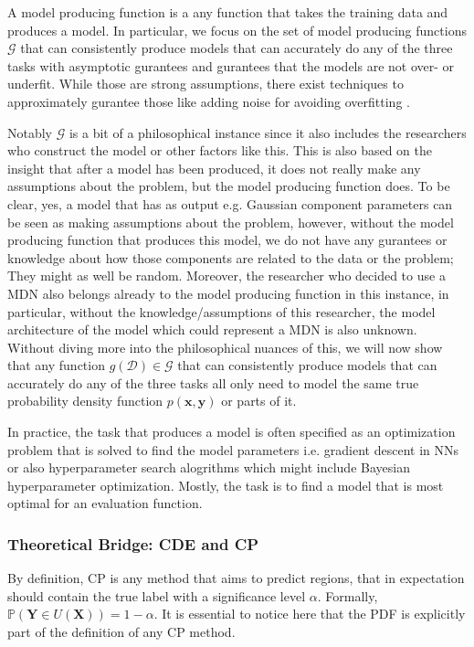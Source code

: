 A model producing function is a any function that takes the training data and produces a model. In particular, we focus on the set of model producing functions $\mathcal{G}$ that can consistently produce models that can accurately do any of the three tasks with asymptotic gurantees and gurantees that the models are not over- or underfit. While those are strong assumptions, there exist techniques to approximately gurantee those like adding noise for avoiding overfitting \cite{rothfuss2019noise}.

Notably $\mathcal{G}$ is a bit of a philosophical instance since it also includes the researchers who construct the model or other factors like this. This is also based on the insight that after a model has been produced, it does not really make any assumptions about the problem, but the model producing function does. To be clear, yes, a model that has as output e.g. Gaussian component parameters can be seen as making assumptions about the problem, however, without the model producing function that produces this model, we do not have any gurantees or knowledge about how those components are related to the data or the problem; They might as well be random. Moreover, the researcher who decided to use a MDN also belongs already to the model producing function in this instance, in particular, without the knowledge/assumptions of this researcher, the model architecture of the model which could represent a MDN is also unknown.\\
Without diving more into the philosophical nuances of this, we will now show that any function $g(\mathcal{D}) \in \mathcal{G}$ that can consistently produce models that can accurately do any of the three tasks all only need to model the same true probability density function $p(\mathbf{x}, \mathbf{y})$ or parts of it.

In practice, the task that produces a model is often specified as an optimization problem that is solved to find the model parameters i.e. gradient descent in NNs or also hyperparameter search alogrithms which might include Bayesian hyperparameter optimization. Mostly, the task is to find a model that is most optimal for an evaluation function.

\subsubsection{Theoretical Bridge: CDE and CP}\label{sec:bridge_cde_cp}

By definition, CP is any method that aims to predict regions, that in expectation should contain the true label with a significance level $\alpha$. Formally,  $\mathbb{P}(\mathbf{Y} \in U(\mathbf{X})) = 1 - \alpha$. It is essential to notice here that the PDF is explicitly part of the definition of any CP method.

